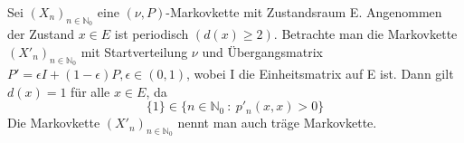 Sei $(X_{n})_{n \in \mathbb{N}_{0}}$ eine $(\nu,P)$-Markovkette mit Zustandsraum E. Angenommen der Zustand $x \in E$ ist periodisch $(d(x) \geq 2)$. Betrachte man die Markovkette $(X'_{n})_{n \in \mathbb{N}_{0}}$ mit Startverteilung $\nu$ und Übergangsmatrix $P' = \epsilon I + (1-\epsilon)P, \epsilon \in (0,1)$, wobei I die Einheitsmatrix auf E ist. Dann gilt $d(x)=1$ für alle $x \in E$, da
\begin{equation*}
\lbrace 1 \rbrace \in \lbrace n \in \mathbb{N}_{0} \: : \: p'_{n}(x,x)>0 \rbrace
\end{equation*}
Die Markovkette  $(X'_{n})_{n \in \mathbb{N}_{0}}$ nennt man auch träge Markovkette.